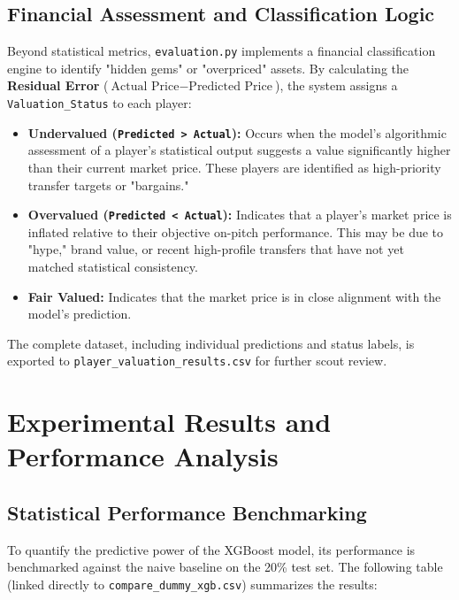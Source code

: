 \documentclass[a4paper,12pt]{report}
\begin{document}
\subsection{Financial Assessment and Classification Logic}

Beyond statistical metrics, \texttt{evaluation.py} implements a financial classification engine to identify "hidden gems" or "overpriced" assets. By calculating the \textbf{Residual Error} ($\text{Actual Price} - \text{Predicted Price}$), the system assigns a \texttt{Valuation\_Status} to each player:

\begin{itemize}
    \item \textbf{Undervalued (\texttt{Predicted > Actual}):} Occurs when the model's algorithmic assessment of a player's statistical output suggests a value significantly higher than their current market price. These players are identified as high-priority transfer targets or "bargains."
    \item \textbf{Overvalued (\texttt{Predicted < Actual}):} Indicates that a player's market price is inflated relative to their objective on-pitch performance. This may be due to "hype," brand value, or recent high-profile transfers that have not yet matched statistical consistency.
    \item \textbf{Fair Valued:} Indicates that the market price is in close alignment with the model's prediction.
\end{itemize}

The complete dataset, including individual predictions and status labels, is exported to \texttt{player\_valuation\_results.csv} for further scout review.

\section{Experimental Results and Performance Analysis}

\subsection{Statistical Performance Benchmarking}

To quantify the predictive power of the XGBoost model, its performance is benchmarked against the naive baseline on the 20\% test set. The following table (linked directly to \texttt{compare\_dummy\_xgb.csv}) summarizes the results:
\end{document}
